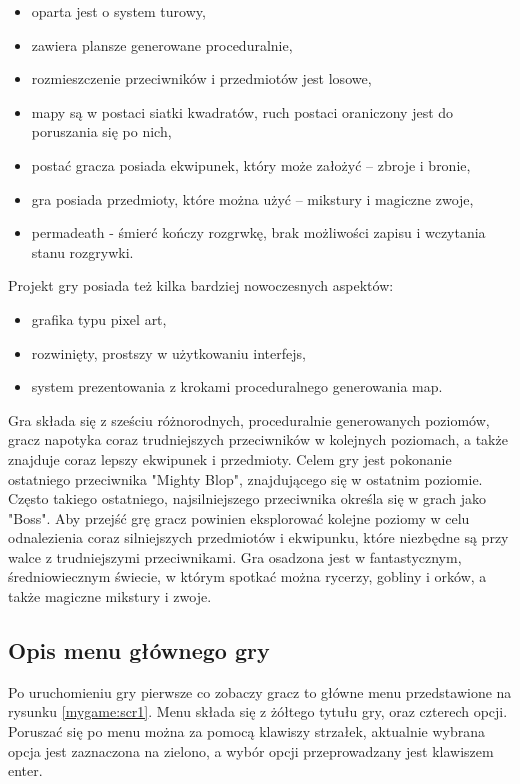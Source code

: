 \documentclass[12pt,twoside]{article}
\begin{document}
\begin{itemize}
	\item oparta jest o system turowy,
	\item zawiera plansze generowane proceduralnie,
	\item rozmieszczenie przeciwników i przedmiotów jest losowe,
	\item mapy są w postaci siatki kwadratów, ruch postaci oraniczony jest do poruszania się po nich,
	\item postać gracza posiada ekwipunek, który może założyć -- zbroje i bronie,
	\item gra posiada przedmioty, które można użyć -- mikstury i magiczne zwoje,
	\item permadeath - śmierć kończy rozgrwkę, brak możliwości zapisu i wczytania stanu rozgrywki.		
\end{itemize}

Projekt gry posiada też kilka bardziej nowoczesnych aspektów:
\begin{itemize}
	\item grafika typu pixel art,
	\item rozwinięty, prostszy w użytkowaniu interfejs,			
	\item system prezentowania z krokami proceduralnego generowania map.
\end{itemize}

Gra składa się z sześciu różnorodnych, proceduralnie generowanych poziomów, gracz napotyka coraz trudniejszych przeciwników w kolejnych poziomach, a także znajduje coraz lepszy ekwipunek i przedmioty. Celem gry jest pokonanie ostatniego przeciwnika "Mighty Blop", znajdującego się w ostatnim poziomie. Często takiego ostatniego, najsilniejszego przeciwnika określa się w grach jako "Boss". Aby przejść grę gracz powinien eksplorować kolejne poziomy w celu odnalezienia coraz silniejszych przedmiotów i ekwipunku, które niezbędne są przy walce z trudniejszymi przeciwnikami.  Gra osadzona jest w fantastycznym, średniowiecznym świecie, w którym spotkać można rycerzy, gobliny i orków, a także magiczne mikstury i zwoje.


\subsection{Opis menu głównego gry}
Po uruchomieniu gry pierwsze co zobaczy gracz to główne menu przedstawione na rysunku \ref{mygame:scr1}. Menu składa się z żółtego tytułu gry, oraz czterech opcji. Poruszać się po menu można za pomocą klawiszy strzałek, aktualnie wybrana opcja jest zaznaczona na zielono, a wybór opcji przeprowadzany jest klawiszem enter.
\end{document}
